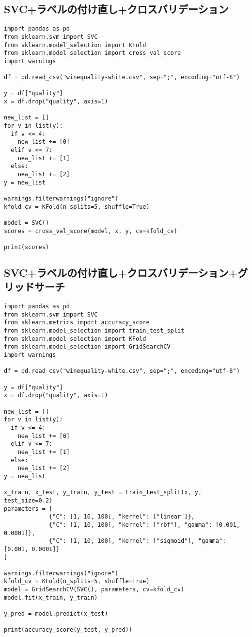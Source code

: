 \documentclass[a4paper, titlepage]{jsarticle}
\begin{document}
	\subsection{SVC+ラベルの付け直し+クロスバリデーション}
	\begin{lstlisting}
import pandas as pd
from sklearn.svm import SVC
from sklearn.model_selection import KFold
from sklearn.model_selection import cross_val_score
import warnings

df = pd.read_csv("winequality-white.csv", sep=";", encoding="utf-8")

y = df["quality"]
x = df.drop("quality", axis=1)

new_list = []
for v in list(y):
  if v <= 4:
    new_list += [0]
  elif v <= 7:
    new_list += [1]
  else:
    new_list += [2]
y = new_list

warnings.filterwarnings("ignore")
kfold_cv = KFold(n_splits=5, shuffle=True)

model = SVC()
scores = cross_val_score(model, x, y, cv=kfold_cv)

print(scores)
	\end{lstlisting}

	\subsection{SVC+ラベルの付け直し+クロスバリデーション+グリッドサーチ}
	\begin{lstlisting}
import pandas as pd
from sklearn.svm import SVC
from sklearn.metrics import accuracy_score
from sklearn.model_selection import train_test_split
from sklearn.model_selection import KFold
from sklearn.model_selection import GridSearchCV
import warnings

df = pd.read_csv("winequality-white.csv", sep=";", encoding="utf-8")

y = df["quality"]
x = df.drop("quality", axis=1)

new_list = []
for v in list(y):
  if v <= 4:
    new_list += [0]
  elif v <= 7:
    new_list += [1]
  else:
    new_list += [2]
y = new_list

x_train, x_test, y_train, y_test = train_test_split(x, y, test_size=0.2)
parameters = [
             {"C": [1, 10, 100], "kernel": ["linear"]},
             {"C": [1, 10, 100], "kernel": ["rbf"], "gamma": [0.001, 0.0001]},
             {"C": [1, 10, 100], "kernel": ["sigmoid"], "gamma": [0.001, 0.0001]}
]

warnings.filterwarnings("ignore")
kfold_cv = KFold(n_splits=5, shuffle=True)
model = GridSearchCV(SVC(), parameters, cv=kfold_cv)
model.fit(x_train, y_train)

y_pred = model.predict(x_test)

print(accuracy_score(y_test, y_pred))
	\end{lstlisting}
\end{document}
